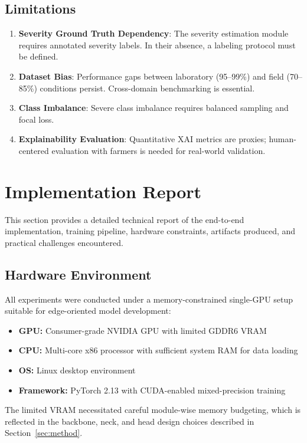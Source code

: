 \documentclass[10pt,a4paper,twocolumn]{article}
\begin{document}
\subsection{Limitations}

\begin{enumerate}
    \item \textbf{Severity Ground Truth Dependency}: The severity estimation module requires annotated severity labels. In their absence, a labeling protocol must be defined.
    \item \textbf{Dataset Bias}: Performance gaps between laboratory (95--99\%) and field (70--85\%) conditions persist. Cross-domain benchmarking is essential.
    \item \textbf{Class Imbalance}: Severe class imbalance requires balanced sampling and focal loss.
    \item \textbf{Explainability Evaluation}: Quantitative XAI metrics are proxies; human-centered evaluation with farmers is needed for real-world validation.
\end{enumerate}

\section{Implementation Report}
\label{sec:impl_report}

This section provides a detailed technical report of the end-to-end implementation, training pipeline, hardware constraints, artifacts produced, and practical challenges encountered.

\subsection{Hardware Environment}

All experiments were conducted under a memory-constrained single-GPU setup suitable for edge-oriented model development:
\begin{itemize}
    \item \textbf{GPU:} Consumer-grade NVIDIA GPU with limited GDDR6 VRAM
    \item \textbf{CPU:} Multi-core x86 processor with sufficient system RAM for data loading
    \item \textbf{OS:} Linux desktop environment
    \item \textbf{Framework:} PyTorch 2.13 with CUDA-enabled mixed-precision training
\end{itemize}

The limited VRAM necessitated careful module-wise memory budgeting, which is reflected in the backbone, neck, and head design choices described in Section~\ref{sec:method}.
\end{document}
